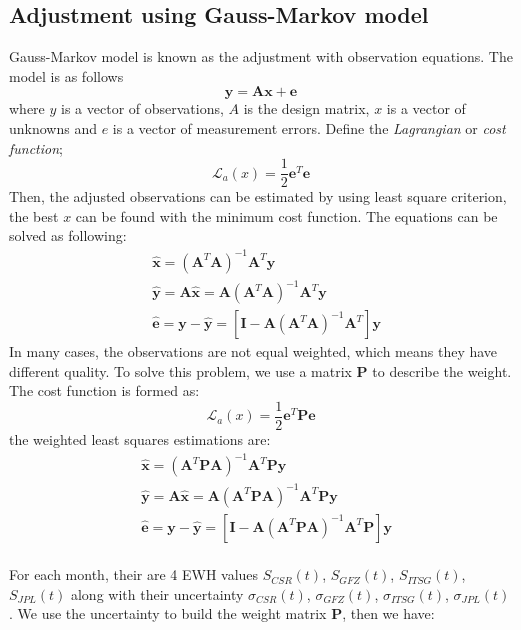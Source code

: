 \subsection{Adjustment using Gauss-Markov model}\label{sec:Gaussmarkov}
Gauss-Markov model is known as the adjustment with observation equations. The model is as follows
\begin{equation}
\bm{y} = \bm{A}\bm{x} + \bm{e}
\end{equation}
where $y$ is a vector of observations, $A$ is the design matrix, $x$ is a vector of unknowns and $e$ is a vector of measurement errors. Define the \textit{Lagrangian} or \textit{cost function};
\begin{equation}
\mathcal{L}_{a}(x) = \frac{1}{2} \bm{e}^T \bm{e}
\end{equation} 
Then, the adjusted observations can be estimated by using least square criterion, the best $x$ can be found with the minimum cost function. The equations can be solved as following:
\begin{align}
&\hat{\bm{x}} = (\bm{A}^T\bm{A})^{-1}\bm{A}^T\bm{y}\\
&\hat{\bm{y}} = \bm{A}\hat{\bm{x}} = \bm{A}(\bm{A}^T\bm{A})^{-1}\bm{A}^T\bm{y}\\
&\hat{\bm{e}} = \bm{y} - \hat{\bm{y}} = [\bm{I} - \bm{A}(\bm{A}^T\bm{A})^{-1}\bm{A}^T]\bm{y}
\end{align}
In many cases, the observations are not equal weighted, which means they have different quality. To solve this problem,  we use a matrix $\bm{P}$ to describe the weight. The cost function is formed as:
\begin{equation}
\mathcal{L}_{a}(x) = \frac{1}{2} \bm{e}^T \bm{P}\bm{e}
\end{equation}
the weighted least squares estimations are:
\begin{align}
\label{equa:guass0}
&\hat{\bm{x}} = (\bm{A}^T \bm{P}\bm{A})^{-1}\bm{A}^T\bm{P}\bm{y}\\ 
&\hat{\bm{y}} = \bm{A}\hat{\bm{x}} = \bm{A}(\bm{A}^T\bm{P}\bm{A})^{-1}\bm{A}^T\bm{P}\bm{y}\\
&\hat{\bm{e}} = \bm{y} - \hat{\bm{y}} = [\bm{I} - \bm{A}(\bm{A}^T\bm{P}\bm{A})^{-1}\bm{A}^T\bm{P}]\bm{y}
\end{align}\\
For each month, their are 4 EWH values $S_{CSR}(t)$, $S_{GFZ}(t)$, $S_{ITSG}(t)$, $S_{JPL}(t)$ along with their uncertainty $\sigma_{CSR}(t)$, $\sigma_{GFZ}(t)$, $\sigma_{ITSG}(t)$, $\sigma_{JPL}(t)$. We use the uncertainty to build the weight matrix $\bm{P}$, then we have:
